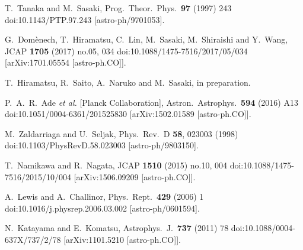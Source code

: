 \documentclass[tightenlines,floats,aps,nofootinbib,prd,onecolumn,preprintnumbers]{revtex4}
\begin{document}
\begin{thebibliography}{5}
  T.~Tanaka and M.~Sasaki,
  Prog.\ Theor.\ Phys.\  {\bf 97} (1997) 243
  doi:10.1143/PTP.97.243
  [astro-ph/9701053].

  G.~Domènech, T.~Hiramatsu, C.~Lin, M.~Sasaki, M.~Shiraishi and Y.~Wang,
  JCAP {\bf 1705} (2017) no.05,  034
  doi:10.1088/1475-7516/2017/05/034
  [arXiv:1701.05554 [astro-ph.CO]].

  T.~Hiramatsu, R.~Saito, A.~Naruko and M.~Sasaki,
  in preparation.

  P.~A.~R.~Ade {\it et al.} [Planck Collaboration],
  Astron.\ Astrophys.\  {\bf 594} (2016) A13
  doi:10.1051/0004-6361/201525830
  [arXiv:1502.01589 [astro-ph.CO]].

  M.~Zaldarriaga and U.~Seljak,
  Phys.\ Rev.\ D {\bf 58}, 023003 (1998)
  doi:10.1103/PhysRevD.58.023003
  [astro-ph/9803150].
	
  T.~Namikawa and R.~Nagata,
  JCAP {\bf 1510} (2015) no.10,  004
  doi:10.1088/1475-7516/2015/10/004
  [arXiv:1506.09209 [astro-ph.CO]].

  A.~Lewis and A.~Challinor,
  Phys.\ Rept.\  {\bf 429} (2006) 1
  doi:10.1016/j.physrep.2006.03.002
  [astro-ph/0601594].


  N.~Katayama and E.~Komatsu,
  Astrophys.\ J.\  {\bf 737} (2011) 78
  doi:10.1088/0004-637X/737/2/78
  [arXiv:1101.5210 [astro-ph.CO]].


\end{thebibliography}
\end{document}
